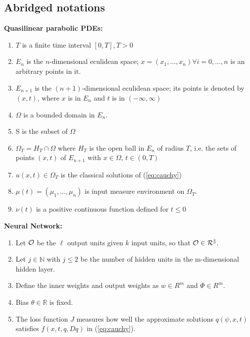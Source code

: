 \documentclass{article}
\begin{document}
	\subsection{Abridged notations}
	\textbf{Quasilinear parabolic PDEs:}
	\begin{enumerate}
			\item $T$ is a finite time interval $[0,T], T>0$
		\item $E_{n}$ is the $n$-dimensional eculidean space; $x = (x_1, \dots , x_n) \forall i = 0, \dots, n$ is an arbitrary points in it.
		\item $E_{n+1}$ is the $(n+1)$-dimensional eculidean space;
		its points is denoted by $(x,t)$, where $x$ is in $E_{n}$ and $t$ is in $(- \infty, \infty)$
		\item $\Omega$ is a bounded domain in $E_{n}$.
		\item S is the subset of $\Omega$
		\item $\Omega_{T} = H_{T} \cap \Omega$ where $H_{T}$ is the open ball in $E_{n}$ of radius $T$, i.e. the sets of points $(x,t)$ of $E_{n+1}$ with $x \in \Omega$, $t \in (0,T)$
		\item $u(x,t) \in \Omega_{T}$ is the classical solutions of (\ref{eq:cauchy})
		\item $\mu(t)=(\mu_1, \dots, \mu_{n})$ is input measure environment on $\Omega_{T}$.
		\item $\nu(t)$ is a positive continuous function defined for $t \leq 0$
	\end{enumerate}
	\textbf{Neural Network:}
	\begin{enumerate}
		\item Let $\cal{O}$ be the $\ell$ output units given $k$ input units, so that $\cal{O} \in R^{k}$.
		\item Let $j \in \mathbb{N}$ with $j \leq 2$ be the number of hidden units in the m-dimensional hidden layer.
		\item Define the inner weights and output weights as $w \in R^m$ and $\Phi \in R^m$.
		\item Bias $\theta \in \mathbb{R}$ is fixed.
		\item The loss function $J$ measures how well the approximate solutions $q(\psi,x,t)$ satisfies $f(x,t,q,Dq)$ in (\ref{eq:cauchy}).
\end{enumerate}
\end{document}

